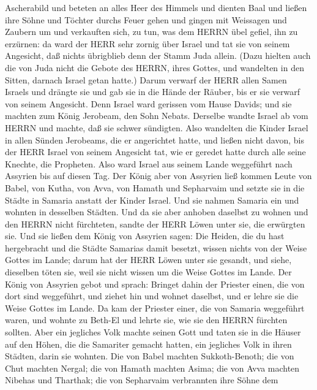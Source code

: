 Ascherabild und beteten an alles Heer des Himmels und dienten Baal
 und ließen ihre Söhne und Töchter durchs Feuer gehen und
gingen mit Weissagen und Zaubern um und verkauften sich, zu tun, was dem
HERRN übel gefiel, ihn zu erzürnen:  da ward der HERR sehr
zornig über Israel und tat sie von seinem Angesicht, daß nichts
übrigblieb denn der Stamm Juda allein.  (Dazu hielten auch
die von Juda nicht die Gebote des HERRN, ihres Gottes, und wandelten in
den Sitten, darnach Israel getan hatte.)  Darum verwarf der
HERR allen Samen Israels und drängte sie und gab sie in die Hände der
Räuber, bis er sie verwarf von seinem Angesicht.  Denn
Israel ward gerissen vom Hause Davids; und sie machten zum König
Jerobeam, den Sohn Nebats. Derselbe wandte Israel ab vom HERRN und
machte, daß sie schwer sündigten.  Also wandelten die
Kinder Israel in allen Sünden Jerobeams, die er angerichtet hatte, und
ließen nicht davon,  bis der HERR Israel von seinem
Angesicht tat, wie er geredet hatte durch alle seine Knechte, die
Propheten. Also ward Israel aus seinem Lande weggeführt nach Assyrien
bis auf diesen Tag.  Der König aber von Assyrien ließ
kommen Leute von Babel, von Kutha, von Avva, von Hamath und Sepharvaim
und setzte sie in die Städte in Samaria anstatt der Kinder Israel. Und
sie nahmen Samaria ein und wohnten in desselben Städten. 
Und da sie aber anhoben daselbst zu wohnen und den HERRN nicht
fürchteten, sandte der HERR Löwen unter sie, die erwürgten sie.
 Und sie ließen dem König von Assyrien sagen: Die Heiden,
die du hast hergebracht und die Städte Samarias damit besetzt, wissen
nichts von der Weise Gottes im Lande; darum hat der HERR Löwen unter sie
gesandt, und siehe, dieselben töten sie, weil sie nicht wissen um die
Weise Gottes im Lande.  Der König von Assyrien gebot und
sprach: Bringet dahin der Priester einen, die von dort sind weggeführt,
und ziehet hin und wohnet daselbst, und er lehre sie die Weise Gottes im
Lande.  Da kam der Priester einer, die von Samaria
weggeführt waren, und wohnte zu Beth-El und lehrte sie, wie sie den
HERRN fürchten sollten.  Aber ein jegliches Volk machte
seinen Gott und taten sie in die Häuser auf den Höhen, die die Samariter
gemacht hatten, ein jegliches Volk in ihren Städten, darin sie wohnten.
 Die von Babel machten Sukkoth-Benoth; die von Chut machten
Nergal; die von Hamath machten Asima;  die von Avva machten
Nibehas und Tharthak; die von Sepharvaim verbrannten ihre Söhne dem
